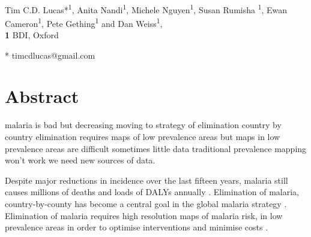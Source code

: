 \documentclass[10pt,letterpaper]{article}
\begin{document}
\vspace*{0.2in}

\begin{flushleft}
{\Large
\textbf{} %
}
\newline
\\
Tim C.D. Lucas*\textsuperscript{1}, Anita Nandi\textsuperscript{1}, Michele Nguyen\textsuperscript{1}, Susan Rumisha \textsuperscript{1}, Ewan Cameron\textsuperscript{1}, Pete Gething\textsuperscript{1} and Dan Weiss\textsuperscript{1},
\\
\bigskip
\textbf{1} BDI, Oxford
\\
\bigskip

% 
%




* timcdlucas@gmail.com

\end{flushleft}
\section*{Abstract}
malaria is bad but decreasing
moving to strategy of elimination country by country
elimination requires maps of low prevalence areas
but maps in low prevalence areas are difficult
sometimes little data
traditional prevalence mapping won't work
we need new sources of data.

Despite major reductions in incidence over the last fifteen years, malaria still causes millions of deaths and loads of DALYs annually \cite{abajobir2017global}.
Elimination of malaria, country-by-county has become a central goal in the global malaria strategy \cite{world2016world}.
Elimination of malaria requires high resolution maps of malaria risk, in low prevalence areas in order to optimise interventions and minimise costs \cite{sturrock2016mapping}.
\end{document}
